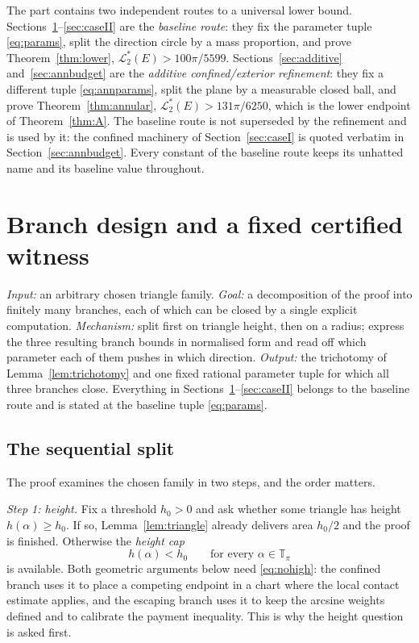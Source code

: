 \documentclass[11pt]{article}
\theoremstyle{plain}
\theoremstyle{definition}
\theoremstyle{remark}
\newcommand{\Tp}{\mathbb{T}_{\pi}}
\newcommand{\Lout}{\mathcal{L}^{*}_{2}}
\begin{document}
The part contains two independent routes to a universal lower bound.
Sections~\ref{sec:trichotomy}--\ref{sec:caseII} are the \emph{baseline route}:
they fix the parameter tuple \eqref{eq:params}, split the direction circle by a
mass proportion, and prove Theorem~\ref{thm:lower}, $\Lout(E)>100\pi/5599$.
Sections~\ref{sec:additive} and~\ref{sec:annbudget} are the \emph{additive
confined/exterior refinement}: they fix a different tuple
\eqref{eq:annparams}, split the plane by a measurable closed ball, and prove
Theorem~\ref{thm:annular}, $\Lout(E)>131\pi/6250$, which is the lower endpoint
of Theorem~\ref{thm:A}. The baseline route is not superseded by the refinement
and is used by it: the confined machinery of Section~\ref{sec:caseI} is quoted
verbatim in Section~\ref{sec:annbudget}. Every constant of the baseline route
keeps its unhatted name and its baseline value throughout.

\section{Branch design and a fixed certified witness}\label{sec:trichotomy}

\emph{Input:} an arbitrary chosen triangle family. \emph{Goal:} a decomposition
of the proof into finitely many branches, each of which can be closed by a
single explicit computation. \emph{Mechanism:} split first on triangle height,
then on a radius; express the three resulting branch bounds in normalised form
and read off which parameter each of them pushes in which direction.
\emph{Output:} the trichotomy of Lemma~\ref{lem:trichotomy} and one fixed
rational parameter tuple for which all three branches close. Everything in
Sections~\ref{sec:trichotomy}--\ref{sec:caseII} belongs to the baseline route
and is stated at the baseline tuple \eqref{eq:params}.

\subsection{The sequential split}\label{sec:seqsplit}

The proof examines the chosen family in two steps, and the order matters.

\emph{Step 1: height.} Fix a threshold $h_{0}>0$ and ask whether some triangle has
height $h(\alpha)\ge h_{0}$. If so, Lemma~\ref{lem:triangle} already delivers area
$h_{0}/2$ and the proof is finished. Otherwise the \emph{height cap}
\begin{equation}\label{eq:nohigh}
  h(\alpha)<h_{0}\qquad\text{for every }\alpha\in\Tp
\end{equation}
is available. Both geometric arguments below need \eqref{eq:nohigh}: the
confined branch uses it to place a competing endpoint in a chart where the local
contact estimate applies, and the escaping branch uses it to keep the arcsine
weights defined and to calibrate the payment inequality. This is why the height
question is asked first.
\end{document}
